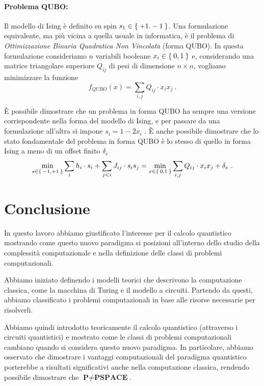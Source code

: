 \paragraph{Problema QUBO:} Il modello di Ising è definito su spin $s_1 \in \Set{+1. -1}$. Una formulazione equivalente, ma più vicina a quella usuale in informatica, è il problema di \emph{Ottimizzazione Binaria Quadratica Non Vincolata} (forma QUBO). In questa formulazione consideriamo $n$ variabili booleane $x_i \in \Set{0,1}$ e, considerando una matrice triangolare superiore $Q_{ij}$ di pesi di dimensione $n\times n$, vogliamo minimizzare la funzione
\begin{equation}
	f_{QUBO}(x) =  \sum_{i, j}Q_{ij}\cdot x_ix_j\ .
	\label{eqn:qubo}
\end{equation}

È possibile dimostrare che un problema in forma QUBO ha sempre una versione corrispondente nella forma del modello di Ising, e per passare da una formulazione all'altra si impone $s_i = 1 - 2 x_i$ \cite{bian2010ising}. È anche possibile dimostrare che lo stato fondamentale del problema in forma QUBO è lo stesso di quello in forma Ising a meno di un offset finito $\delta_e$
\begin{equation}
	\min_{s\in\Set{-1, +1}}  \sum_{i}h_i\cdot s_i + \sum_{j < i} J_{ij}\cdot s_i s_j = \min_{x\in\Set{0, 1}} \sum_{i, j}Q_{ij}\cdot x_ix_j + \delta_e\ .
	\label{eqn:ising_qubo}
\end{equation}

\section{Conclusione}
In questo lavoro abbiamo giustificato l'interesse per il calcolo quantistico mostrando come questo nuovo paradigma si posizioni all'interno dello studio della complessità computazionale e nella definizione delle classi di problemi computazionali.

Abbiamo iniziato definendo i modelli teorici che descrivono la computazione classica, come la macchina di Turing e il modello a circuiti. Partendo da questi, abbiamo classificato i problemi computazionali in base alle risorse necessarie per risolverli.

Abbiamo quindi introdotto teoricamente il calcolo quantistico (attraverso i circuiti quantistici) e mostrato come le classi di problemi computazionali cambiano quando si considera questo nuovo paradigma. In particolare, abbiamo osservato che dimostrare i vantaggi computazionali del paradigma quantistico porterebbe a risultati significativi anche nella computazione classica, rendendo possibile dimostrare che $\textbf{P} \neq \textbf{PSPACE}$.

